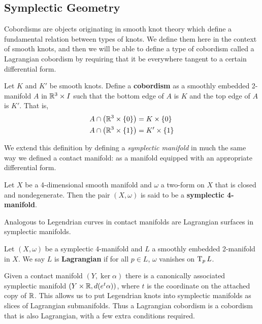 \subsection{Symplectic Geometry}

Cobordisms are objects originating in smooth knot theory which define a fundamental relation between types of knots. We define them here in the context of smooth knots, and then we will be able to define a type of cobordism called a Lagrangian cobordism by requiring that it be everywhere tangent to a certain differential form.

\begin{defn}
    Let $K$ and $K'$ be smooth knots. Define a \textbf{cobordism} as a smoothly embedded 2-manifold $A$ in $\mathbb{R}^3 \times I$ such that the bottom edge of $A$ is $K$ and the top edge of $A$ is $K'$. That is,
    \begin{align*}
        A \cap \left(\mathbb{R}^3 \times \{0\}\right) &= K \times \{0\}\\
        A \cap \left(\mathbb{R}^3 \times \{1\}\right) &= K' \times \{1\}
    \end{align*}
\end{defn}

We extend this definition by defining a \emph{symplectic manifold} in much the same way we defined a contact manifold: as a manifold equipped with an appropriate differential form.

\begin{defn}
    Let $X$ be a 4-dimensional smooth manifold and $\omega$ a two-form on $X$ that is closed and nondegenerate. Then the pair $(X, \omega)$ is said to be a \textbf{symplectic 4-manifold}.
\end{defn}

Analogous to Legendrian curves in contact manifolds are Lagrangian surfaces in symplectic manifolds.
\begin{defn}
    Let $(X, \omega)$ be a symplectic 4-manifold and $L$ a smoothly embedded 2-manifold in $X$. We say $L$ is \textbf{Lagrangian} if for all $p \in L$, $\omega$ vanishes on $\operatorname{T}_p L$.
\end{defn}


Given a contact manifold $(Y, \ker \alpha)$ there is a canonically associated symplectic manifold $(Y \times \mathbb{R}, d(e^t \alpha))$, where $t$ is the coordinate on the attached copy of $\mathbb{R}$. This allows us to put Legendrian knots into symplectic manifolds as slices of Lagrangian submanifolds. Thus a Lagrangian cobordism is a cobordism that is also Lagrangian, with a few extra conditions required.

